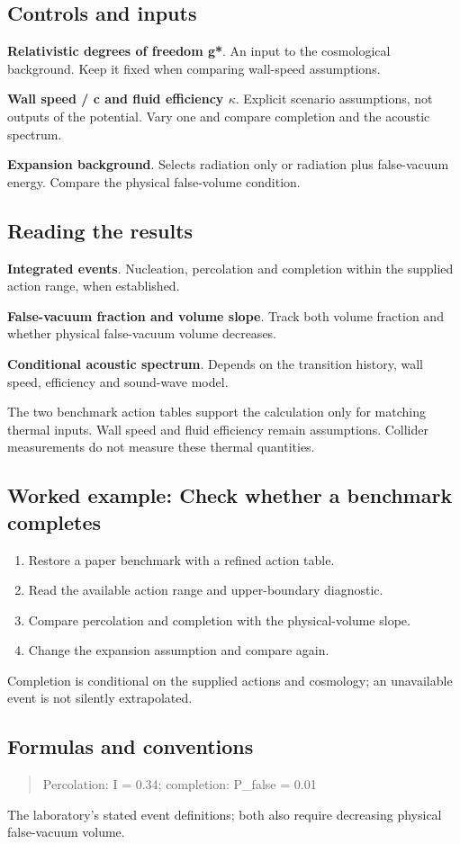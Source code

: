 \documentclass[11pt,a4paper]{article}
\begin{document}
\subsection*{Controls and inputs}
\textbf{Relativistic degrees of freedom g*}. An input to the cosmological background. Keep it fixed when comparing wall-speed assumptions.

\textbf{Wall speed / c and fluid efficiency \ensuremath{\kappa}}. Explicit scenario assumptions, not outputs of the potential. Vary one and compare completion and the acoustic spectrum.

\textbf{Expansion background}. Selects radiation only or radiation plus false-vacuum energy. Compare the physical false-volume condition.

\subsection*{Reading the results}
\textbf{Integrated events}. Nucleation, percolation and completion within the supplied action range, when established.

\textbf{False-vacuum fraction and volume slope}. Track both volume fraction and whether physical false-vacuum volume decreases.

\textbf{Conditional acoustic spectrum}. Depends on the transition history, wall speed, efficiency and sound-wave model.

The two benchmark action tables support the calculation only for matching thermal inputs. Wall speed and fluid efficiency remain assumptions. Collider measurements do not measure these thermal quantities.
\subsection*{Worked example: Check whether a benchmark completes}
\begin{enumerate}
\item Restore a paper benchmark with a refined action table.
\item Read the available action range and upper-boundary diagnostic.
\item Compare percolation and completion with the physical-volume slope.
\item Change the expansion assumption and compare again.
\end{enumerate}
Completion is conditional on the supplied actions and cosmology; an unavailable event is not silently extrapolated.
\subsection*{Formulas and conventions}
\begin{quote}Percolation: I = 0.34; completion: P\_false = 0.01\end{quote}
The laboratory's stated event definitions; both also require decreasing physical false-vacuum volume.
\end{document}
